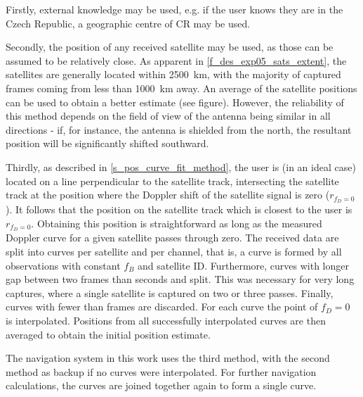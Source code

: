 Firstly, external knowledge may be used, e.g. if the user knows they are in the Czech Republic, a geographic centre of CR may be used.

Secondly, the position of any received satellite may be used, as those can be assumed to be relatively close. As apparent in \autoref{f_des_exp05_sats_extent}, the satellites are generally located within \qty{2500}{km}, with the majority of captured frames coming from less than \qty{1000}{km} away. An average of the satellite positions can be used to obtain a better estimate (see figure). However, the reliability of this method depends on the field of view of the antenna being similar in all directions - if, for instance, the antenna is shielded from the north, the resultant position will be significantly shifted southward.

Thirdly, as described in \autoref{s_pos_curve_fit_method}, the user is (in an ideal case) located on a line perpendicular to the satellite track, intersecting the satellite track at the position where the Doppler shift of the satellite signal is zero ($r_{f_D = 0}$). It follows that the position on the satellite track which is closest to the user is $r_{f_D = 0}$. Obtaining this position is straightforward as long as the measured Doppler curve for a given satellite passes through zero.
The received data are split into curves per satellite and per channel, that is, a curve is formed by all observations with constant $f_B$ and satellite ID. Furthermore, curves with longer gap between two frames than  seconds and split.
This was necessary for very long captures, where a single satellite is captured on two or three passes. Finally, curves with fewer than  frames are discarded. For each curve the point of $f_D = 0$ is interpolated. Positions from all successfully interpolated curves are then averaged to obtain the initial position estimate.

The navigation system in this work uses the third method, with the second method as backup if no curves were interpolated. %
For further navigation calculations, the curves are joined together again to form a single curve.


